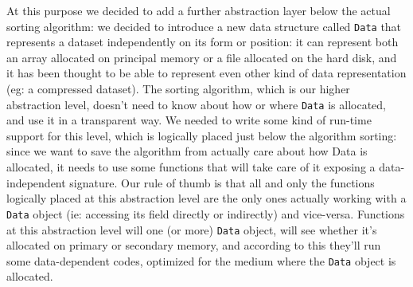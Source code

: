 At this purpose we decided to add a further abstraction layer below the actual sorting algorithm: we decided to introduce a new data structure called \texttt{Data} that represents a dataset independently on its form or position: it can represent both an array allocated on principal memory or a file allocated on the hard disk, and it has been thought to be able to represent even other kind of data representation (eg: a compressed dataset). The sorting algorithm, which is our higher abstraction level, doesn't need to know about how or where \texttt{Data} is allocated, and use it in a transparent way.
We needed to write some kind of run-time support for this level, which is logically placed just below the algorithm sorting: since we want to save the algorithm from actually care about how Data is allocated, it needs to use some functions that will take care of it exposing a data-independent signature. Our rule of thumb is that all and only the functions logically placed at this abstraction level are the only ones actually working with a \texttt{Data} object (ie: accessing its field directly or indirectly) and vice-versa.
Functions at this abstraction level will one (or more) \texttt{Data} object, will see whether it's allocated on primary or secondary memory, and according to this they'll run some data-dependent codes, optimized for the medium where the \texttt{Data} object is allocated.





